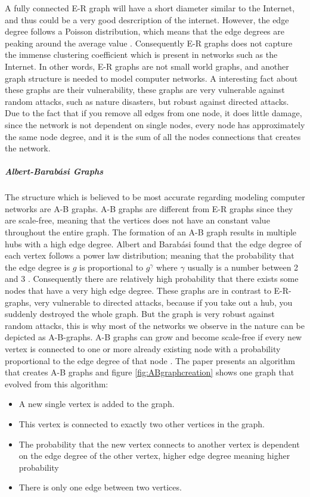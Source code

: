 A fully connected E-R graph will have a short diameter similar to the Internet, and thus could be a very good desrcription of the internet. However, the edge degree follows a Poisson distribution, which means that the edge degrees are peaking around the average value \cite{audestad}. Consequently E-R graphs does not capture the immense clustering coefficient which is present in networks such as the Internet. In other words, E-R graphs are not small world graphs, and another graph structure is needed to model computer networks.
A interesting fact about these graphs are their vulnerability, these graphs are very vulnerable against random attacks, such as nature disasters, but robust against directed attacks. Due to the fact that if you remove all edges from one node, it does little damage, since the network is not dependent on single nodes, every node has approximately the same node degree, and it is the sum of all the nodes connections that creates the network.

\subparagraph{\label{ABgraph}Albert-Barabási Graphs}
The structure which is believed to be most accurate regarding modeling computer networks are A-B graphs. A-B graphs are different from E-R graphs since they are scale-free, meaning that the vertices does not have an constant value throughout the entire graph. The formation of an A-B graph results in multiple hubs with a high edge degree. Albert and Barabási found that the edge degree of each vertex follows a power law distribution; meaning that the probability that the edge degree is $g$ is proportional to $g^{\gamma}$
where $\gamma$ usually is a number between 2 and 3 \cite{audestad}. Consequently there are relatively high probability that there exists some nodes that have a very high edge degree. 
These graphs are in contrast to E-R-graphs, very vulnerable to directed attacks, because if you take out a hub, you suddenly destroyed the whole graph. But the graph is very robust against random attacks, this is why most of the networks we observe in the nature can be depicted as A-B-graphs.
A-B graphs can grow and become scale-free if every new vertex is connected to one or more already existing node with a probability proportional to the edge degree of that node . The paper presents an algorithm that creates A-B graphs and figure \ref{fig:ABgraphcreation} shows one graph that evolved from this algorithm:

\begin{itemize}
\item A new single vertex is added to the graph.
\item This vertex is connected to exactly two other vertices in the graph.
\item The probability that the new vertex connects to another vertex is dependent on the edge degree of the other vertex, higher edge degree meaning higher probability
\item There is only one edge between two vertices.
\end{itemize}


